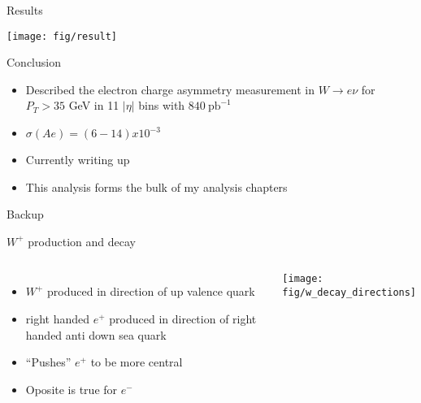 \documentclass[8pt]{beamer}
\begin{document}
\begin{frame}{Results}
  \begin{center}
    \texttt{[image: fig/result]}
  \end{center}
\end{frame}

\begin{frame}{Conclusion}
  \begin{itemize}
    \item Described the electron charge asymmetry measurement in $W\to e\nu$ for
$P_T>35$ GeV in 11 $|\eta|$ bins with $840\ \mathrm{pb}^{-1}$ 
    \item $\sigma(Ae) = (6-14) x 10^{-3}$
    \vspace{1cm}
    \item Currently writing up
    \item This analysis forms the bulk of my analysis chapters

  \end{itemize}
\end{frame}


\begin{frame}{Backup}
\end{frame}

\begin{frame}{$W^{+}$ production and decay}
  \begin{columns}[c]
  \begin{itemize}
  \item $W^{+}$ produced in direction of up valence quark
  \item right handed $e^{+}$ produced in direction of right handed anti down sea quark
  \item ``Pushes'' $e^{+}$ to be more central
  \item Oposite is true for $e^{-}$
  \end{itemize}
    \begin{center}
      \texttt{[image: fig/w\_decay\_directions]}
    \end{center}
  \end{columns}
\end{frame}
\end{document}
